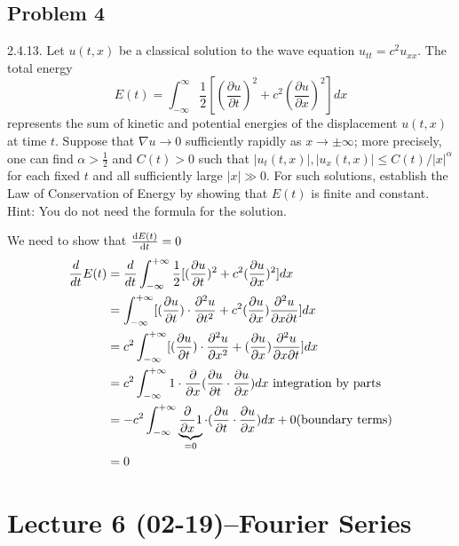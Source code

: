 \subsection*{Problem 4}
2.4.13. Let $u(t,x)$ be a classical solution to the wave equation $u_{tt}=c^2 u_{xx}$. The total energy 
$$E(t) = \int_{-\infty}^{\infty} \frac{1}{2} \left[ \left( \frac{\partial u}{\partial t} \right)^2 + c^2 \left( \frac{\partial u}{\partial x} \right)^2 \right] dx$$
represents the sum of kinetic and potential energies of the displacement $u(t,x)$ at time $t$. Suppose that $\nabla u \to 0$ sufficiently rapidly as $x \to \pm \infty$; more precisely, one can find $\alpha > \frac{1}{2}$ and $C(t) > 0$ such that $|u_t(t,x)|, |u_x(t,x)| \leq C(t)/|x|^{\alpha}$ for each fixed $t$ and all sufficiently large $|x| \gg 0$. For such solutions, establish the Law of Conservation of Energy by showing that $E(t)$ is finite and constant. Hint: You do not need the formula for the solution.
\begin{solution}
    We need to show that $ \dv{E(t)}{t}=0 $ 
    \begin{align*}{}{}
    \frac{d}{dt}E(t)&=\frac{d}{dt}\int_{-\infty}^{+\infty}\frac{1}{2}[(\pdv{u}{t})^2+c^2(\pdv{u}{x})^2]dx\\
    &=\int_{-\infty}^{+\infty}[(\pdv{u}{t})\cdot\pdv[2]{u}{t}+c^2(\pdv{u}{x})\pdv{u}{x}{t}]dx\\
    &=c^2\int_{-\infty}^{+\infty}[(\pdv{u}{t})\cdot\pdv[2]{u}{x}+(\pdv{u}{x})\pdv{u}{x}{t}]dx\\
    &=c^2\int_{-\infty}^{+\infty}1\cdot \frac{\partial}{\partial x}(\pdv{u}{t}\cdot \pdv{u}{x})dx \text{ integration by parts}\\
    &=-c^2\int_{-\infty}^{+\infty} \underbrace{\frac{\partial}{\partial x}1}_{=0}\cdot(\pdv{u}{t}\cdot \pdv{u}{x})dx +0 (\text{boundary terms})\\
    &=0
    \end{align*}
\end{solution}
\section{Lecture 6 (02-19)--{Fourier Series}}
